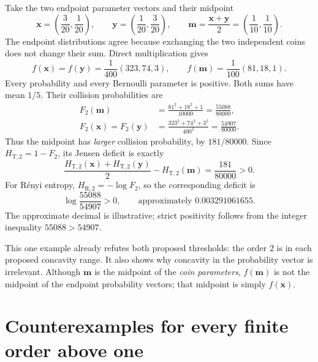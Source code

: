 \documentclass[11pt]{article}
\numberwithin{equation}{section}
\theoremstyle{definition}
\theoremstyle{remark}
\begin{document}
Take the two endpoint parameter vectors and their midpoint
\begin{equation}
 \boldsymbol x=\left(\frac3{20},\frac1{20}\right),\qquad
 \boldsymbol y=\left(\frac1{20},\frac3{20}\right),\qquad
 \boldsymbol m=\frac{\boldsymbol x+\boldsymbol y}{2}
 =\left(\frac1{10},\frac1{10}\right).\label{eq:witness}
\end{equation}
The endpoint distributions agree because exchanging the two independent
coins does not change their sum. Direct multiplication gives
\begin{equation}
 f(\boldsymbol x)=f(\boldsymbol y)=\frac1{400}(323,74,3),\qquad
 f(\boldsymbol m)=\frac1{100}(81,18,1).
\end{equation}
Every probability and every Bernoulli parameter is positive. Both sums have
mean $1/5$. Their collision probabilities are
\begin{align}
 F_2(\boldsymbol m)&=\frac{81^2+18^2+1}{10000}
 =\frac{55088}{80000},\\
 F_2(\boldsymbol x)=F_2(\boldsymbol y)&=
 \frac{323^2+74^2+3^2}{400^2}
 =\frac{54907}{80000}.
\end{align}
Thus the midpoint has \emph{larger} collision probability, by
$181/80000$. Since $H_{\mathrm T,2}=1-F_2$, its Jensen deficit is exactly
\begin{equation}
 \frac{H_{\mathrm T,2}(\boldsymbol x)+H_{\mathrm T,2}(\boldsymbol y)}2
 -H_{\mathrm T,2}(\boldsymbol m)
 =\frac{181}{80000}>0.\label{eq:exactgap}
\end{equation}
For R\'enyi entropy, $H_{\mathrm R,2}=-\log F_2$, so the corresponding deficit
is
\begin{equation}
 \log\frac{55088}{54907}>0,
 \qquad\text{approximately }0.003291061655.\label{eq:renyigap}
\end{equation}
The approximate decimal is illustrative; strict positivity follows from the
integer inequality $55088>54907$.

This one example already refutes both proposed thresholds: the order $2$
is in each proposed concavity range. It also shows why concavity in the
probability vector is irrelevant. Although $\boldsymbol m$ is the midpoint
of the \emph{coin parameters}, $f(\boldsymbol m)$ is not the midpoint of the
endpoint probability vectors; that midpoint is simply $f(\boldsymbol x)$.

\section{Counterexamples for every finite order above one}
\end{document}
